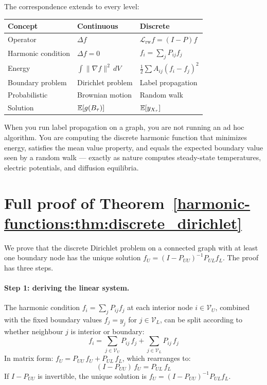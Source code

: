 \begin{notechapter}
The correspondence extends to every level:

\begin{center}
\begin{tabular}{lll}
\toprule
Concept & Continuous & Discrete \\
\midrule
Operator & $\Delta f$ & $\mathcal{L}_{\mathrm{rw}} f = (I - P)f$ \\
Harmonic condition & $\Delta f = 0$ &
  $f_i = \sum_j P_{ij}f_j$ \\
Energy & $\int \|\nabla f\|^2\,dV$ &
  $\frac{1}{2}\sum A_{ij}(f_i - f_j)^2$ \\
Boundary problem & Dirichlet problem & Label propagation \\
Probabilistic & Brownian motion & Random walk \\
Solution & $\mathbb{E}[g(B_\tau)]$ & $\mathbb{E}[y_{X_\tau}]$ \\
\bottomrule
\end{tabular}
\end{center}

When you run label propagation on a graph, you are not running an ad hoc
algorithm. You are computing the discrete harmonic function that minimizes
energy, satisfies the mean value property, and equals the expected boundary
value seen by a random walk --- exactly as nature computes steady-state
temperatures, electric potentials, and diffusion equilibria.


\newpage
\chapterappendix

\section{Full proof of Theorem~\ref{harmonic-functions:thm:discrete_dirichlet}}
\label{harmonic-functions:app:proof_dirichlet}

We prove that the discrete Dirichlet problem on a connected graph with at
least one boundary node has the unique solution
$f_U = (I - P_{UU})^{-1}P_{UL}f_L$. The proof has three steps.

\paragraph{Step 1: deriving the linear system.} The harmonic condition
$f_i = \sum_j P_{ij}f_j$ at each interior node $i \in \mathcal{V}_U$,
combined with the fixed boundary values $f_j = y_j$ for
$j \in \mathcal{V}_L$, can be split according to whether neighbour $j$ is
interior or boundary:
\[
f_i = \sum_{j \in \mathcal{V}_U} P_{ij}\,f_j
    + \sum_{j \in \mathcal{V}_L} P_{ij}\,f_j
\]
In matrix form: $f_U = P_{UU}\,f_U + P_{UL}\,f_L$, which rearranges to:
\begin{equation}
\label{harmonic-functions:eq:app_linear_system}
(I - P_{UU})\,f_U = P_{UL}\,f_L
\end{equation}
If $I - P_{UU}$ is invertible, the unique solution is
$f_U = (I - P_{UU})^{-1}P_{UL}f_L$.


\end{notechapter}
